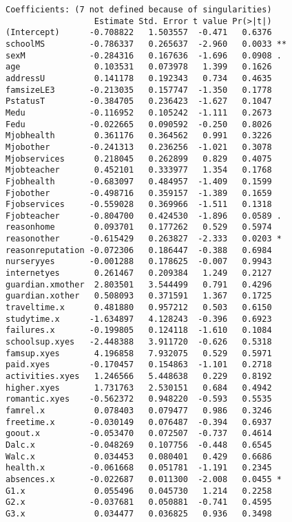 \documentclass[11pt]{article}
\begin{document}
\begin{enumerate}
\begin{verbatim}
Coefficients: (7 not defined because of singularities)
                  Estimate Std. Error t value Pr(>|t|)    
(Intercept)      -0.708822   1.503557  -0.471   0.6376    
schoolMS         -0.786337   0.265637  -2.960   0.0033 ** 
sexM             -0.284316   0.167636  -1.696   0.0908 .  
age               0.103531   0.073978   1.399   0.1626    
addressU          0.141178   0.192343   0.734   0.4635    
famsizeLE3       -0.213035   0.157747  -1.350   0.1778    
PstatusT         -0.384705   0.236423  -1.627   0.1047    
Medu             -0.116952   0.105242  -1.111   0.2673    
Fedu             -0.022665   0.090592  -0.250   0.8026    
Mjobhealth        0.361176   0.364562   0.991   0.3226    
Mjobother        -0.241313   0.236256  -1.021   0.3078    
Mjobservices      0.218045   0.262899   0.829   0.4075    
Mjobteacher       0.452101   0.333977   1.354   0.1768    
Fjobhealth       -0.683097   0.484957  -1.409   0.1599    
Fjobother        -0.498716   0.359157  -1.389   0.1659    
Fjobservices     -0.559028   0.369966  -1.511   0.1318    
Fjobteacher      -0.804700   0.424530  -1.896   0.0589 .  
reasonhome        0.093701   0.177262   0.529   0.5974    
reasonother      -0.615429   0.263827  -2.333   0.0203 *  
reasonreputation -0.072306   0.186447  -0.388   0.6984    
nurseryyes       -0.001288   0.178625  -0.007   0.9943    
internetyes       0.261467   0.209384   1.249   0.2127    
guardian.xmother  2.803501   3.544499   0.791   0.4296    
guardian.xother   0.508093   0.371591   1.367   0.1725    
traveltime.x      0.481880   0.957212   0.503   0.6150    
studytime.x      -1.634897   4.128243  -0.396   0.6923    
failures.x       -0.199805   0.124118  -1.610   0.1084    
schoolsup.xyes   -2.448388   3.911720  -0.626   0.5318    
famsup.xyes       4.196858   7.932075   0.529   0.5971    
paid.xyes        -0.170457   0.154863  -1.101   0.2718    
activities.xyes   1.246566   5.448638   0.229   0.8192    
higher.xyes       1.731763   2.530151   0.684   0.4942    
romantic.xyes    -0.562372   0.948220  -0.593   0.5535    
famrel.x          0.078403   0.079477   0.986   0.3246    
freetime.x       -0.030149   0.076487  -0.394   0.6937    
goout.x          -0.053470   0.072507  -0.737   0.4614    
Dalc.x           -0.048269   0.107756  -0.448   0.6545    
Walc.x            0.034453   0.080401   0.429   0.6686    
health.x         -0.061668   0.051781  -1.191   0.2345    
absences.x       -0.022687   0.011300  -2.008   0.0455 *  
G1.x              0.055496   0.045730   1.214   0.2258    
G2.x             -0.037681   0.050881  -0.741   0.4595    
G3.x              0.034477   0.036825   0.936   0.3498    

\end{verbatim}
\end{enumerate}
\end{document}
